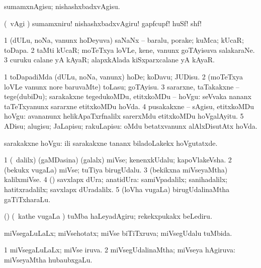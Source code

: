\noindent
\gl{\sakirx}
\expl{}
\bmng
sumamxnAgisu; nishashxbadxvAgisu. 
\emng

\noindent 
\gl{\akirx}
\expl{}
\bmng
(\kanmu\ \BAavayx vAgi \parx) sumamxniru! nishashxbadxvAgiru! gapfcupf! huSf! shf! 
\emng
\eentry

\bentry
{} 
\gl{\nA}
\expl{}
\bmng
\bnum
\num{1} (dULu, noNa, \mo vanunx hoDeyuva) saNaNx -- baralu, porake; kuMca; kUcaR; toDapa. 
\num{2} taMti kUcaR; moTeTxya loVLe, kene, \mo vanunx goTAyisuva salakaraNe. 
\num{3} curuku calane yA kAyaR; alapxkAlada kiSxparxcalane yA kAyaR. 
\enum
\emng
\eentry

\bentry
{} 
\gl{\sakirx}
\expl{}
\bmng
\bnum
\num{1} toDapadiMda (dULu, noNa, \mo vanunx) hoDe; koDavu; JUDisu. 
\num{2} (moTeTxya loVLe \mo vanunx nore baruvaMte) toLasu; goTAyisu. 
\num{3} sararxne, taTakakxne -- tege(dubiDu); sarakakxne tegedukoMDu, etitxkoMDu -- hoVgu:  seVvaka nananx taTeTxyanunx sararxne etitxkoMDu hoVda. 
\num{4} pusakakxne -- sAgisu, etitxkoMDu hoVgu:  avananunx helikApaTxrfnalilx sarerxMdu etitxkoMDu hoVgalAyitu. 
\num{5} ADisu; alugisu; JaLapisu; rakuLapisu:  oMdu betatxvanunx alAlxDisutAtx hoVda. 
\enum
\emng

\noindent
\gl{\akirx}
\expl{}
\bmng
sarakakxne hoVgu:  ili sarakakxne tananx biladoLakekx hoVgutatxde. 
\emng
\eentry

\bentry
{} 
\gl{\nA}
\expl{}
\bmng
\bnum
\num{1} (\sA\ \bava dalilx) (gaMDasina) (galalx) miVse; kenenxkUdalu; kapoVlakeVsha. 
\num{2} (bekukx \mo vugaLa) miVse; tuTiya birugUdalu. 
\num{3} (bekikxna miVseyaMtha) kalilxmiVse. 
\num{4} (\AmA) savxlapx dUra; anatidUra:  samiVpadalilx; sanihadalilx; hatitxradalilx; savxlapx dUradalilx. 
\num{5} (loVha \mo vugaLa) birugUdalinaMtha gaTiTxharaLu. 
\enum
\emng

\noindent
\gl{\pagu}
\expl{}
\bmng
{} (\AmA) (\kanmu\ kathe \mo vugaLa \vi) tuMba haLeyadAgiru; rekekxpukakx beLediru. 
\emng
\eentry

\bentry
{} 
\gl{\gu}
\expl{}
\bmng
miVsegaLuLaLx; miVsehotatx; miVse biTiTxruva; miVsegUdalu tuMbida. 
\emng
\eentry

\bentry
{} 
\gl{\gu}
\expl{}
\bmng
\bnum
\num{1} miVsegaLuLaLx; miVse iruva. 
\num{2} miVsegUdalinaMtha; miVseya hAgiruva:  miVseyaMtha hubaubxgaLu. 
\enum
\emng
\eentry

